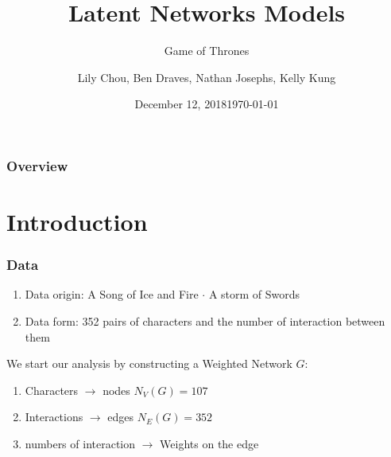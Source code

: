 \documentclass[handout]{beamer}
\title{Latent Networks Models}
\subtitle{Game of Thrones}
\author{Lily Chou, Ben Draves, Nathan Josephs, Kelly Kung}
\date{December 12, 2018}
\institute[Boston University] 
{
  Department of Mathematics and Statistics\\
  Boston University
  }
\date{\today}
\begin{document}
%
%
\begin{frame}
  \titlepage
\end{frame}
\begin{frame}
\frametitle{Overview}
\tableofcontents
\end{frame}

\section{Introduction}
\begin{frame}
 \frametitle{Data}
\begin{enumerate}
\item Data origin: A Song of Ice and Fire $\cdot$ A storm of Swords
\item Data form: 352 pairs of characters and the number of interaction between them
\end{enumerate}

We start our analysis by constructing a Weighted Network $G$: 
\begin{enumerate}[i]
\item Characters $\rightarrow$ nodes 
\:  $N_V (G)= 107$
\item Interactions $\rightarrow$ edges   
\: $N_E (G) = 352$
\item numbers of interaction $\rightarrow$ Weights on the edge
\end{enumerate}
\end{frame}
\end{document}
